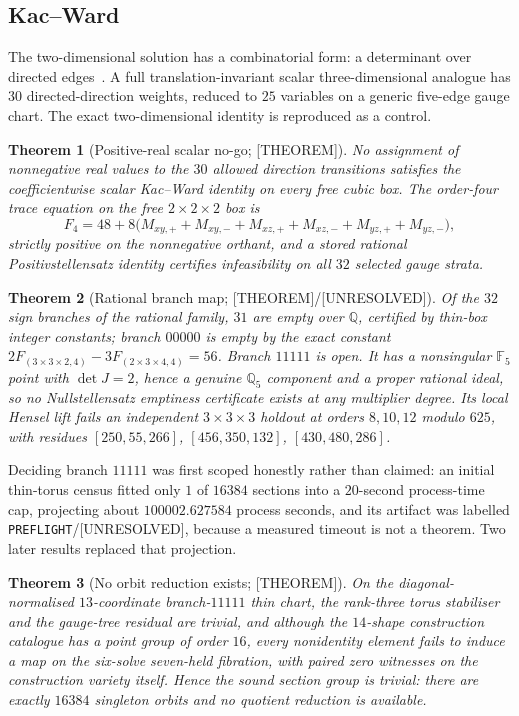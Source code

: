 \documentclass[11pt]{article}
\newtheorem{theorem}{Theorem}[section]
\theoremstyle{definition}
\newcommand{\Qb}{\mathbb{Q}}
\newcommand{\Fb}{\mathbb{F}}
\begin{document}
\subsection{Kac--Ward}\label{sec:kw}
The two-dimensional solution has a combinatorial form: a determinant over directed
edges~\cite{kacward1952}. A full translation-invariant scalar three-dimensional analogue has $30$
directed-direction weights, reduced to $25$ variables on a generic five-edge gauge chart. The exact
two-dimensional identity is reproduced as a control.

\begin{theorem}[Positive-real scalar no-go; {[THEOREM]}]\label{thm:kwpos}
No assignment of nonnegative real values to the $30$ allowed direction transitions satisfies the
coefficientwise scalar Kac--Ward identity on every free cubic box. The order-four trace equation on
the free $2\times2\times2$ box is
\[
F_4=48+8\bigl(M_{xy,+}+M_{xy,-}+M_{xz,+}+M_{xz,-}+M_{yz,+}+M_{yz,-}\bigr),
\]
strictly positive on the nonnegative orthant, and a stored rational Positivstellensatz identity
certifies infeasibility on all $32$ selected gauge strata.
\end{theorem}

\begin{theorem}[Rational branch map; {[THEOREM]}/{[UNRESOLVED]}]\label{thm:kwbranch}
Of the $32$ sign branches of the rational family, $31$ are empty over $\Qb$, certified by thin-box
integer constants; branch $00000$ is empty by the exact constant $2F_{(3\times3\times2,4)}-
3F_{(2\times3\times4,4)}=56$. Branch $11111$ is open. It has a nonsingular $\Fb_5$ point with
$\det J=2$, hence a genuine $\Qb_5$ component and a proper rational ideal, so \emph{no}
Nullstellensatz emptiness certificate exists at any multiplier degree. Its local Hensel lift fails an
independent $3\times3\times3$ holdout at orders $8,10,12$ modulo $625$, with residues
$[250,55,266]$, $[456,350,132]$, $[430,480,286]$.
\end{theorem}

Deciding branch $11111$ was first scoped honestly rather than claimed: an initial thin-torus census
fitted only $1$ of $16384$ sections into a $20$-second process-time cap, projecting about
$100002.627584$ process seconds, and its artifact was labelled \texttt{PREFLIGHT}/[UNRESOLVED],
because a measured timeout is not a theorem. Two later results replaced that projection.

\begin{theorem}[No orbit reduction exists; {[THEOREM]}]\label{thm:kwquot}
On the diagonal-normalised $13$-coordinate branch-$11111$ thin chart, the rank-three torus stabiliser
and the gauge-tree residual are trivial, and although the $14$-shape construction catalogue has a
point group of order $16$, every nonidentity element fails to induce a map on the six-solve
seven-held fibration, with paired zero witnesses on the construction variety itself. Hence the sound
section group is trivial: there are exactly $16384$ singleton orbits and no quotient reduction is
available.
\end{theorem}
\end{document}
